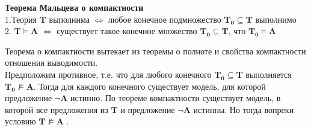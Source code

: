 \begin{theorem} 

\textbf{Теорема Мальцева о компактности}\\
    1.Теория $\boldsymbol{T}$ выполнима $ \Longleftrightarrow$ любое конечное подмножество $\boldsymbol{T_0}\subseteq \boldsymbol{T}$ выполнимо\\
    2. $\boldsymbol{T}\models \boldsymbol{A}$   $ \Longleftrightarrow$ существует такое конечное множество $\boldsymbol{T_0}\subseteq \boldsymbol{T}$, что $\boldsymbol{T_0}\models \boldsymbol{A}$  
\end{theorem}
Теорема о компактности вытекает из теоремы о полноте и свойства компактности отношения выводимости.\\
Предположим противное, т.е. что для любого конечного $\boldsymbol{T_0}\subseteq \boldsymbol{T}$ выполняется  $\boldsymbol{T_0}\nvDash \boldsymbol{A}$. Тогда для каждого конечного существует модель, для которой предложение $\neg \boldsymbol{A}$  истинно. По теореме компактности существует модель, в которой все предложения из $\boldsymbol{T}$ и предложение $\neg \boldsymbol{A}$ истинны. Но тогда вопреки условию $\boldsymbol{T}\nvDash \boldsymbol{A}$ .